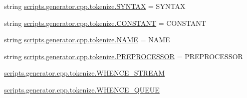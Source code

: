\begin{DoxyCompactItemize}
\item 
string \mbox{\hyperlink{namespacescripts_1_1generator_1_1cpp_1_1tokenize_acf1e3927c8d9070a9968036b882f8b1b}{scripts.\+generator.\+cpp.\+tokenize.\+S\+Y\+N\+T\+AX}} = \textquotesingle{}S\+Y\+N\+T\+AX\textquotesingle{}
\item 
string \mbox{\hyperlink{namespacescripts_1_1generator_1_1cpp_1_1tokenize_a8beeceeb6b7ed20dc86219a81a667a5e}{scripts.\+generator.\+cpp.\+tokenize.\+C\+O\+N\+S\+T\+A\+NT}} = \textquotesingle{}C\+O\+N\+S\+T\+A\+NT\textquotesingle{}
\item 
string \mbox{\hyperlink{namespacescripts_1_1generator_1_1cpp_1_1tokenize_a9ad8912ef794e5a7e4971d818f8a050d}{scripts.\+generator.\+cpp.\+tokenize.\+N\+A\+ME}} = \textquotesingle{}N\+A\+ME\textquotesingle{}
\item 
string \mbox{\hyperlink{namespacescripts_1_1generator_1_1cpp_1_1tokenize_a1e2a7c28f95726ab2f0d3b491ddc0d70}{scripts.\+generator.\+cpp.\+tokenize.\+P\+R\+E\+P\+R\+O\+C\+E\+S\+S\+OR}} = \textquotesingle{}P\+R\+E\+P\+R\+O\+C\+E\+S\+S\+OR\textquotesingle{}
\item 
\mbox{\hyperlink{namespacescripts_1_1generator_1_1cpp_1_1tokenize_a2535617a0a968dbe861fa90f427a36f2}{scripts.\+generator.\+cpp.\+tokenize.\+W\+H\+E\+N\+C\+E\+\_\+\+S\+T\+R\+E\+AM}}
\item 
\mbox{\hyperlink{namespacescripts_1_1generator_1_1cpp_1_1tokenize_a25bc661c759185a5fd6a9710fef73894}{scripts.\+generator.\+cpp.\+tokenize.\+W\+H\+E\+N\+C\+E\+\_\+\+Q\+U\+E\+UE}}
\end{DoxyCompactItemize}
